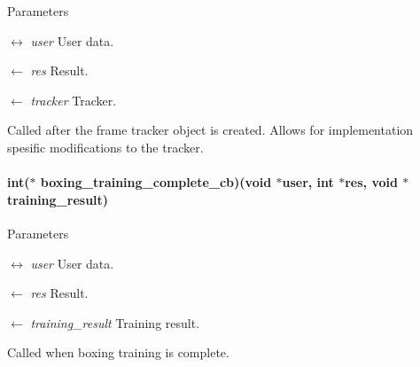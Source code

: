 \begin{DoxyParams}{Parameters}
\item[\mbox{$\leftrightarrow$} {\em user}]User data. \item[\mbox{$\leftarrow$} {\em res}]Result. \item[\mbox{$\leftarrow$} {\em tracker}]Tracker.\end{DoxyParams}
Called after the frame tracker object is created. Allows for implementation spesific modifications to the tracker. \hypertarget{group__unboxer_gaaafcc2fdb11841b10ab6adb26b06eb09}{
\paragraph[{boxing\_\-training\_\-complete\_\-cb}]{\setlength{\rightskip}{0pt plus 5cm}int($\ast$ {\bf boxing\_\-training\_\-complete\_\-cb})(void $\ast$user, int $\ast$res, void $\ast$training\_\-result)}\hfill}
\label{group__unboxer_gaaafcc2fdb11841b10ab6adb26b06eb09}

\begin{DoxyParams}{Parameters}
\item[\mbox{$\leftrightarrow$} {\em user}]User data. \item[\mbox{$\leftarrow$} {\em res}]Result. \item[\mbox{$\leftarrow$} {\em training\_\-result}]Training result.\end{DoxyParams}
Called when boxing training is complete. 

